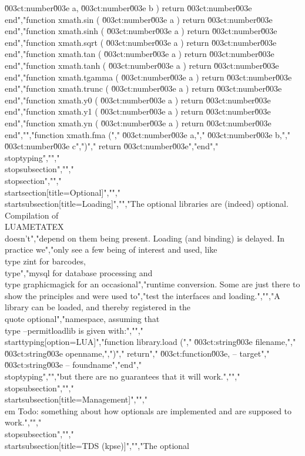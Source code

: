 \u003ct:number\u003e a, \u003ct:number\u003e b ) return \u003ct:number\u003e end","function xmath.sin        ( \u003ct:number\u003e a )               return \u003ct:number\u003e end","function xmath.sinh       ( \u003ct:number\u003e a )               return \u003ct:number\u003e end","function xmath.sqrt       ( \u003ct:number\u003e a )               return \u003ct:number\u003e end","function xmath.tan        ( \u003ct:number\u003e a )               return \u003ct:number\u003e end","function xmath.tanh       ( \u003ct:number\u003e a )               return \u003ct:number\u003e end","function xmath.tgamma     ( \u003ct:number\u003e a )               return \u003ct:number\u003e end","function xmath.trunc      ( \u003ct:number\u003e a )               return \u003ct:number\u003e end","function xmath.y0         ( \u003ct:number\u003e a )               return \u003ct:number\u003e end","function xmath.y1         ( \u003ct:number\u003e a )               return \u003ct:number\u003e end","function xmath.yn         ( \u003ct:number\u003e a )               return \u003ct:number\u003e end","","function xmath.fma (","    \u003ct:number\u003e a,","    \u003ct:number\u003e b,","    \u003ct:number\u003e c",")","    return \u003ct:number\u003e","end","\\stoptyping","","\\stopsubsection","","\\stopsection","","\\startsection[title={Optional}]","","\\startsubsection[title=Loading]","","The optional libraries are (indeed) optional. Compilation of \\LUAMETATEX\\ doesn't","depend on them being present. Loading (and binding) is delayed. In practice we","only see a few being of interest and used, like \\type {zint} for barcodes, \\type","{mysql} for database processing and \\type {graphicmagick} for an occasional","runtime conversion. Some are just there to show the principles and were used to","test the interfaces and loading.","","A library can be loaded, and thereby registered in the \\quote {optional}","namespace, assuming that \\type {--permitloadlib} is given with:","","\\starttyping[option=LUA]","function library.load (","    \u003ct:string\u003e filename,","    \u003ct:string\u003e openname,",")","    return","        \u003ct:function\u003e, -- target","        \u003ct:string\u003e    -- foundname","end","\\stoptyping","","but there are no guarantees that it will work.","","\\stopsubsection","","\\startsubsection[title=Management]","","{\\em Todo: something about how optionals are implemented and are supposed to work.}","","\\stopsubsection","","\\startsubsection[title=TDS (kpse)]","","The optional 